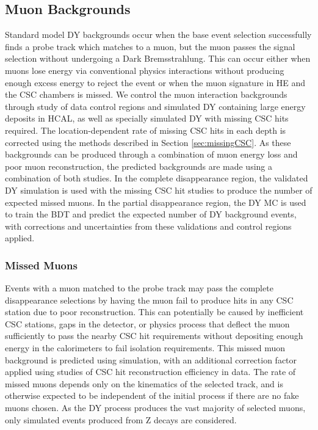 \subsection{Muon Backgrounds}
Standard model DY backgrounds occur when the base event selection successfully finds a probe track which matches to a muon, but the muon passes the signal selection without undergoing a Dark Bremsstrahlung. This can occur either when muons lose energy via conventional physics interactions without producing enough excess energy to reject the event or when the muon signature in HE and the CSC chambers is missed.
We control the muon interaction backgrounds through study of data control regions and simulated DY containing large energy deposits in HCAL, as well as specially simulated DY with missing CSC hits required. The location-dependent rate of missing CSC hits in each depth is corrected using the methods described in Section \ref{sec:missingCSC}.
As these backgrounds can be produced through a combination of muon energy loss and poor muon reconstruction, the predicted backgrounds are made using a combination of both studies. In the complete disappearance region, the validated DY simulation is used with the missing CSC hit studies to produce the number of expected missed muons. In the partial disappearance region, the DY MC is used to train the BDT and predict the expected number of DY background events, with corrections and uncertainties from these validations and control regions applied.
\subsubsection{Missed Muons}

Events with a muon matched to the probe track may pass the complete disappearance selections by having the muon fail to produce hits in any CSC station due to poor reconstruction. This can potentially be caused by inefficient CSC stations, gaps in the detector, or physics process that deflect the muon sufficiently to pass the nearby CSC hit requirements without depositing enough energy in the calorimeters to fail isolation requirements. This missed muon background is predicted using simulation, with an additional correction factor applied using studies of CSC hit reconstruction efficiency in data. The rate of missed muons depends only on the kinematics of the selected track, and is otherwise expected to be independent of the initial process if there are no fake muons chosen. As the DY process produces the vast majority of selected muons, only simulated events produced from Z decays are considered.

